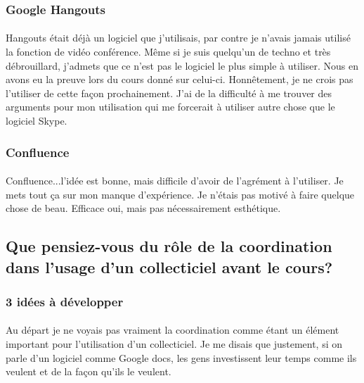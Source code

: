 \documentclass[12pt]{article}
\begin{document}
\subsubsection{Google Hangouts}
\paragraph{}
Hangouts était déjà un logiciel que j'utilisais, par contre je n'avais jamais utilisé la fonction de vidéo conférence. Même si je suis quelqu'un de techno et très débrouillard, j'admets que ce n'est pas le logiciel le plus simple à utiliser. Nous en avons eu la preuve lors du cours donné sur celui-ci. Honnêtement, je ne crois pas l'utiliser de cette façon prochainement. J'ai de la difficulté à me trouver des arguments pour mon utilisation qui me forcerait à utiliser autre chose que le logiciel Skype.

\subsubsection{Confluence}
\paragraph{}
Confluence...l'idée est bonne, mais difficile d'avoir de l'agrément à l'utiliser. Je mets tout ça sur mon manque d'expérience. Je n'étais pas motivé à faire quelque chose de beau. Efficace oui, mais pas nécessairement esthétique.

\subsection{Que pensiez-vous du rôle de la coordination dans l’usage d’un collecticiel avant le cours?}
\begin{comment}
- 3 idées (développez)
- 2 questions, 1 analogie**
** "Une analogie est un processus de pensée par lequel on remarque une similitude de forme entre deux 		choses, par ailleurs de différentes natures ou classes." Source : Wikipedia page consultée le 13.01.2015
\end{comment}

\subsubsection{3 idées à développer}
\paragraph{}
Au départ je ne voyais pas vraiment la coordination comme étant un élément important pour l'utilisation d'un collecticiel. Je me disais que justement, si on parle d'un logiciel comme Google docs, les gens investissent leur temps comme ils veulent et de la façon qu'ils le veulent.
\end{document}
